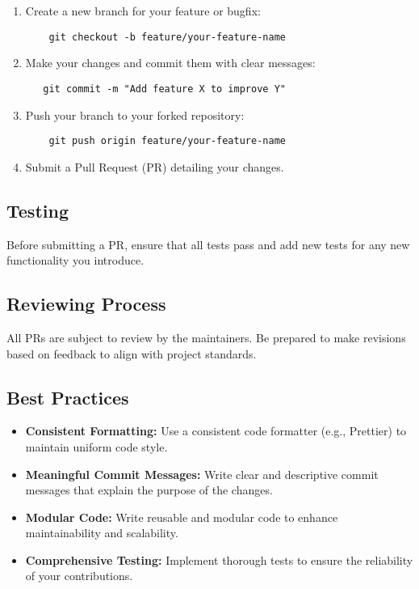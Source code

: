 \documentclass[12pt,a4paper]{article}
\begin{document}
\begin{enumerate}
    \item Create a new branch for your feature or bugfix:
\begin{verbatim}
    git checkout -b feature/your-feature-name
\end{verbatim}

    \item Make your changes and commit them with clear messages:
\begin{verbatim}
   git commit -m "Add feature X to improve Y"
\end{verbatim}

    \item Push your branch to your forked repository:
\begin{verbatim}
    git push origin feature/your-feature-name
\end{verbatim}

    \item Submit a Pull Request (PR) detailing your changes.
\end{enumerate}

\subsection{Testing}
Before submitting a PR, ensure that all tests pass and add new tests for any new functionality you introduce.

\subsection{Reviewing Process}
All PRs are subject to review by the maintainers. Be prepared to make revisions based on feedback to align with project standards.

\subsection{Best Practices}

\begin{itemize}
    \item \textbf{Consistent Formatting:} Use a consistent code formatter (e.g., Prettier) to maintain uniform code style.

    \item \textbf{Meaningful Commit Messages:} Write clear and descriptive commit messages that explain the purpose of the changes.

    \item \textbf{Modular Code:} Write reusable and modular code to enhance maintainability and scalability.

    \item \textbf{Comprehensive Testing:} Implement thorough tests to ensure the reliability of your contributions.
\end{itemize}
\end{document}
